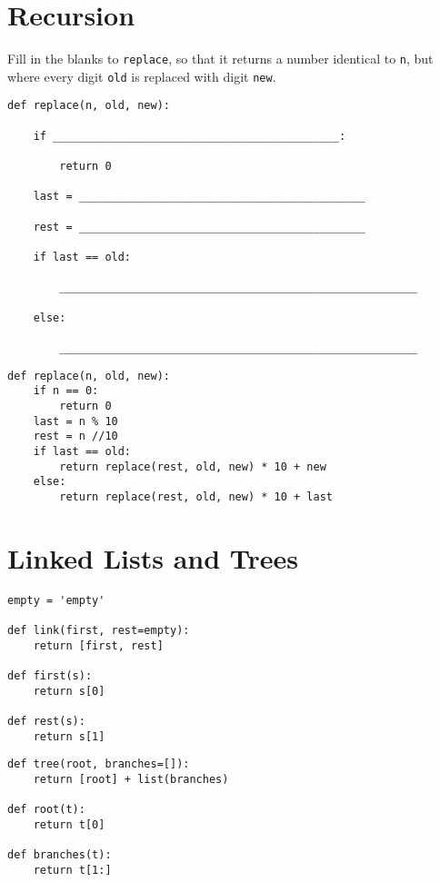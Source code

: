 \documentclass{exam}
\begin{document}
\section{Recursion}
\begin{questions}
\question Fill in the blanks to \lstinline$replace$, so that it returns a number identical to \lstinline$n$, but where every digit \lstinline$old$ is replaced with digit \lstinline$new$.

\ifprintanswers\else
\begin{lstlisting}
def replace(n, old, new): 

    if ____________________________________________:

        return 0

    last = ____________________________________________

    rest = ____________________________________________

    if last == old:

        _______________________________________________________

    else:

        _______________________________________________________
\end{lstlisting}
\fi

\begin{solution}
\begin{lstlisting}
def replace(n, old, new):
    if n == 0: 
        return 0
    last = n % 10
    rest = n //10
    if last == old:
        return replace(rest, old, new) * 10 + new
    else:
        return replace(rest, old, new) * 10 + last
\end{lstlisting}
\end{solution}
\end{questions}

\clearpage 

\section{Linked Lists and Trees}

\begin{minipage}{0.5\linewidth}
\begin{lstlisting}
empty = 'empty'

def link(first, rest=empty):
    return [first, rest]

def first(s):
    return s[0] 
    
def rest(s):
    return s[1]
\end{lstlisting}
\end{minipage}
\begin{minipage}{0.5\linewidth}
\begin{lstlisting}
def tree(root, branches=[]):
    return [root] + list(branches)

def root(t):
    return t[0]

def branches(t): 
    return t[1:]
\end{lstlisting}
\end{minipage}
\end{document}

